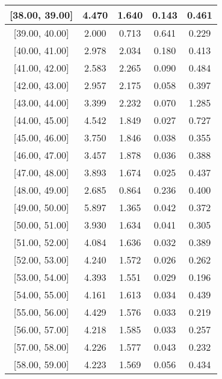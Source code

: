 \documentclass[12pt]{article}
\begin{document}
\begin{table}[]
\begin{tabular}{c|c|c|c|c|}
\multicolumn{1}{|c|}{{[}38.00,  39.00{]}}  & 4.470 & 1.640 & 0.143 & 0.461 \\ \hline 
\multicolumn{1}{|c|}{{[}39.00,  40.00{]}}  & 2.000 & 0.713 & 0.641 & 0.229 \\ \hline 
\multicolumn{1}{|c|}{{[}40.00,  41.00{]}}  & 2.978 & 2.034 & 0.180 & 0.413 \\ \hline 
\multicolumn{1}{|c|}{{[}41.00,  42.00{]}}  & 2.583 & 2.265 & 0.090 & 0.484 \\ \hline 
\multicolumn{1}{|c|}{{[}42.00,  43.00{]}}  & 2.957 & 2.175 & 0.058 & 0.397 \\ \hline 
\multicolumn{1}{|c|}{{[}43.00,  44.00{]}}  & 3.399 & 2.232 & 0.070 & 1.285 \\ \hline 
\multicolumn{1}{|c|}{{[}44.00,  45.00{]}}  & 4.542 & 1.849 & 0.027 & 0.727 \\ \hline 
\multicolumn{1}{|c|}{{[}45.00,  46.00{]}}  & 3.750 & 1.846 & 0.038 & 0.355 \\ \hline 
\multicolumn{1}{|c|}{{[}46.00,  47.00{]}}  & 3.457 & 1.878 & 0.036 & 0.388 \\ \hline 
\multicolumn{1}{|c|}{{[}47.00,  48.00{]}}  & 3.893 & 1.674 & 0.025 & 0.437 \\ \hline 
\multicolumn{1}{|c|}{{[}48.00,  49.00{]}}  & 2.685 & 0.864 & 0.236 & 0.400 \\ \hline 
\multicolumn{1}{|c|}{{[}49.00,  50.00{]}}  & 5.897 & 1.365 & 0.042 & 0.372 \\ \hline 
\multicolumn{1}{|c|}{{[}50.00,  51.00{]}}  & 3.930 & 1.634 & 0.041 & 0.305 \\ \hline 
\multicolumn{1}{|c|}{{[}51.00,  52.00{]}}  & 4.084 & 1.636 & 0.032 & 0.389 \\ \hline 
\multicolumn{1}{|c|}{{[}52.00,  53.00{]}}  & 4.240 & 1.572 & 0.026 & 0.262 \\ \hline 
\multicolumn{1}{|c|}{{[}53.00,  54.00{]}}  & 4.393 & 1.551 & 0.029 & 0.196 \\ \hline 
\multicolumn{1}{|c|}{{[}54.00,  55.00{]}}  & 4.161 & 1.613 & 0.034 & 0.439 \\ \hline 
\multicolumn{1}{|c|}{{[}55.00,  56.00{]}}  & 4.429 & 1.576 & 0.033 & 0.219 \\ \hline 
\multicolumn{1}{|c|}{{[}56.00,  57.00{]}}  & 4.218 & 1.585 & 0.033 & 0.257 \\ \hline 
\multicolumn{1}{|c|}{{[}57.00,  58.00{]}}  & 4.226 & 1.577 & 0.043 & 0.232 \\ \hline 
\multicolumn{1}{|c|}{{[}58.00,  59.00{]}}  & 4.223 & 1.569 & 0.056 & 0.434 \\ \hline 

\end{tabular}
\end{table}
\end{document}
